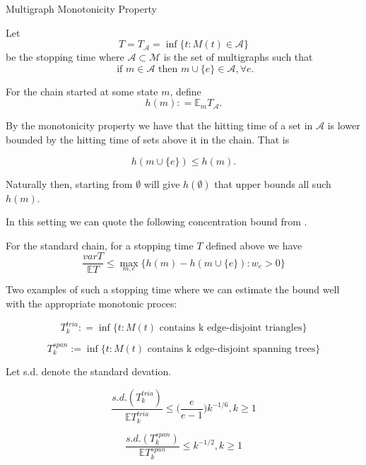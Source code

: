 \begin{definition}

Multigraph Monotonicity Property

Let $$ T = T_{\mathcal{A}} = \inf \{t : M(t) \in \mathcal{A}\}$$ be the stopping time where $\mathcal{A} \subset \mathcal{M}$ is the set of multigraphs such that $$ \text{ if } m \in \mathcal{A} \text{ then } m \cup \{e\} \in \mathcal{A}, \forall e.$$

For the chain started at some state $m$, define $$ h(m): = \mathbb{E}_mT_{\mathcal{A}}.$$



By the monotonicity property we have that the hitting time of a set in $\mathcal{A}$ is lower bounded by the hitting time of sets above it in the chain.  That is

\begin{equation}
h(m\cup \{e\}) \leq h(m).
\end{equation}

\end{definition}

Naturally then, starting from $\emptyset$ will give $h(\emptyset)$ that upper bounds all such $h(m)$. 

In this setting we can quote the following concentration bound from \cite{david_FFP}.

\begin{prop}
For the standard chain, for a stopping time $T$ defined above we have $$ \frac{var T}{\mathbb{E}T} \leq \max_{m, e}\{h(m) - h(m \cup \{e\}) : w_e > 0\}$$
\end{prop}

Two examples of such a stopping time where we can estimate the bound well with the appropriate monotonic proces: 

$$ T^{tria}_k : = \inf\{t: M(t) \text{ contains k edge-disjoint triangles}\} $$

$$ T^{span}_k := \inf\{t: M(t) \text{ contains k edge-disjoint spanning trees} \}$$

\begin{prop}

Let s.d. denote the standard devation. 

$$ \frac{s.d.(T^{tria}_k)}{\mathbb{E}T^{tria}_k} \leq \bigg( \frac{e}{e-1}\bigg)k^{-1/6}, k \geq 1$$

$$ \frac{s.d.(T^{span}_k)}{\mathbb{E}T^{span}_k} \leq k^{-1/2}, k \geq 1$$

\end{prop}

